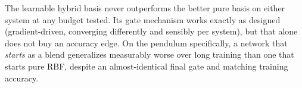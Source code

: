 \begin{keypoint}[Verdict]
The learnable hybrid basis never outperforms the better pure basis on either
system at any budget tested. Its gate mechanism works exactly as designed
(gradient-driven, converging differently and sensibly per system), but that
alone does not buy an accuracy edge. On the pendulum specifically, a
network that \emph{starts} as a blend generalizes measurably worse over long
training than one that starts pure RBF, despite an almost-identical final
gate and matching training accuracy.
\end{keypoint}
